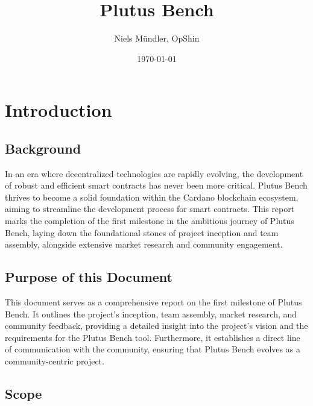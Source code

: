 \documentclass[11pt]{article}
\title{Plutus Bench}
\author{Niels Mündler, OpShin}
\date{\today}
\begin{document}
\maketitle

\section{Introduction}
\subsection{Background}
In an era where decentralized technologies are rapidly evolving, the development of robust and efficient smart contracts has never been more critical.
Plutus Bench thrives to become a solid foundation within the Cardano blockchain ecosystem,
aiming to streamline the development process for smart contracts.
This report marks the completion of the first milestone in the ambitious journey of Plutus Bench,
laying down the foundational stones of project inception and team assembly,
alongside extensive market research and community engagement.

\subsection{Purpose of this Document}

This document serves as a comprehensive report on the first milestone of Plutus Bench.
It outlines the project's inception, team assembly, market research, and community feedback,
providing a detailed insight into the project's vision and the requirements for the Plutus Bench tool.
Furthermore, it establishes a direct line of communication with the community,
ensuring that Plutus Bench evolves as a community-centric project.

\subsection{Scope}
\end{document}
